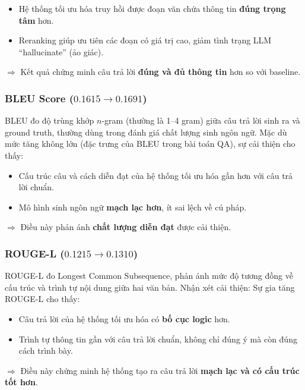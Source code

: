 \begin{itemize}
    \item Hệ thống tối ưu hóa truy hồi được đoạn văn chứa thông tin \textbf{đúng trọng tâm} hơn.
    \item Reranking giúp ưu tiên các đoạn có giá trị cao, giảm tình trạng LLM ``hallucinate'' (ảo
    giác).
\end{itemize}

$\Rightarrow$ Kết quả chứng minh câu trả lời \textbf{đúng và đủ thông tin} hơn so với baseline.

\subsubsection*{BLEU Score ($0.1615 \rightarrow 0.1691$)}

BLEU đo độ trùng khớp $n$-gram (thường là 1--4 gram) giữa câu trả lời sinh ra và ground truth,
thường dùng trong đánh giá chất lượng sinh ngôn ngữ. Mặc dù mức tăng không lớn (đặc trưng
của BLEU trong bài toán QA), sự cải thiện cho thấy:

\begin{itemize}
    \item Cấu trúc câu và cách diễn đạt của hệ thống tối ưu hóa gần hơn với câu trả lời chuẩn.
    \item Mô hình sinh ngôn ngữ \textbf{mạch lạc hơn}, ít sai lệch về cú pháp.
\end{itemize}

$\Rightarrow$ Điều này phản ánh \textbf{chất lượng diễn đạt} được cải thiện.

\subsubsection*{ROUGE-L ($0.1215 \rightarrow 0.1310$)}

ROUGE-L đo Longest Common Subsequence, phản ánh mức độ tương đồng về cấu trúc và trình
tự nội dung giữa hai văn bản. Nhận xét cải thiện: Sự gia tăng ROUGE-L cho thấy:

\begin{itemize}
    \item Câu trả lời của hệ thống tối ưu hóa có \textbf{bố cục logic} hơn.
    \item Trình tự thông tin gần với câu trả lời chuẩn, không chỉ đúng ý mà còn đúng cách trình
    bày.
\end{itemize}

$\Rightarrow$ Điều này chứng minh hệ thống tạo ra câu trả lời \textbf{mạch lạc và có cấu trúc tốt hơn}.

